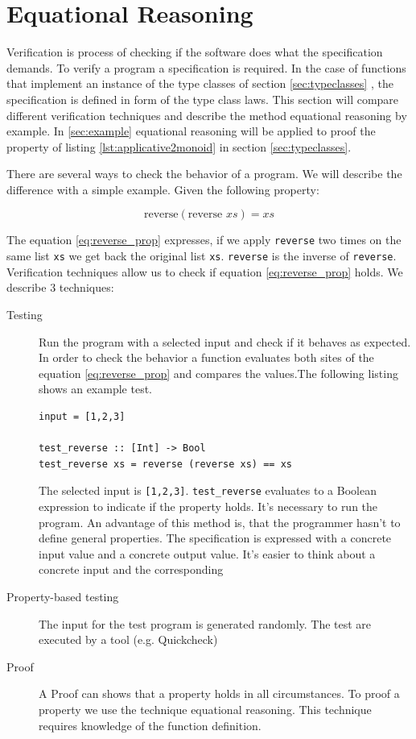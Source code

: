 \section{Equational Reasoning}
\label{sec:equationalreasoning}

Verification is process of checking if the software does what the specification demands. To verify a program a specification is required. In the case of functions that implement an instance of the type classes of section \ref{sec:typeclasses} , the specification is defined in form of the type class laws.
This section will compare different verification techniques and describe the method equational reasoning by example. In \ref{sec:example} equational reasoning will be applied to proof the property of listing \ref{lst:applicative2monoid} in section \ref{sec:typeclasses}.

There are several ways to check the behavior of a program. 
We will describe the difference with a simple example. Given the following property:

\begin{equation}
  \label{eq:reverse_prop}
\text{reverse} (\text{reverse } xs) = xs  
\end{equation}

The equation \ref{eq:reverse_prop} expresses, if we apply \verb|reverse| two times on the same list \verb|xs| we get back the original list \verb|xs|. \verb|reverse| is the inverse of \verb|reverse|. Verification techniques allow us to check if equation \ref{eq:reverse_prop} holds. We describe 3 techniques:

\begin{description}
\item[Testing] Run the program with a selected input and check if it behaves as expected. In order to check the behavior a function evaluates both sites of the equation \ref{eq:reverse_prop} and compares the values.The following listing shows an example test.

\begin{verbatim}
input = [1,2,3]

test_reverse :: [Int] -> Bool
test_reverse xs = reverse (reverse xs) == xs
\end{verbatim}

The selected input is \verb|[1,2,3]|. \verb|test_reverse| evaluates to a Boolean expression to indicate if the property holds. It's necessary to run the program.
An advantage of this method is, that the programmer hasn't to define general properties. The specification is expressed with a concrete input value and a concrete output value. It's easier to think about a concrete input and the corresponding 
\item[Property-based testing] The input for the test program is generated randomly. The test are executed by a tool (e.g. Quickcheck)
\item[Proof] A Proof can shows that a property holds in all circumstances. To proof a property we use the technique equational reasoning. This technique requires knowledge of the function definition.
\end{description}

